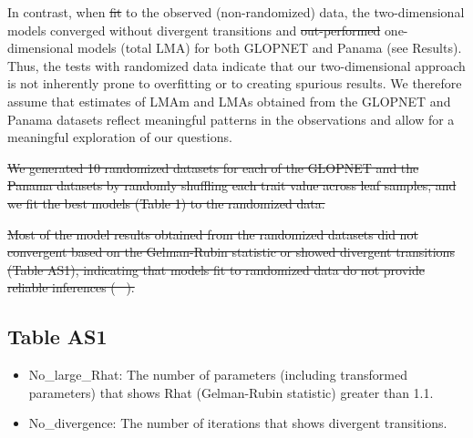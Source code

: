 \documentclass[
  12pt,
  letterpaper,
  DIV=11,
  numbers=noendperiod]{scrartcl}
\numberwithin{equation}{section} %
\providecommand{\DIFadd}[1]{{\protect\color{blue}\uwave{#1}}} %
\providecommand{\DIFdel}[1]{{\protect\color{red}\sout{#1}}}                      %
\providecommand{\DIFaddbegin}{} %
\providecommand{\DIFaddend}{} %
\providecommand{\DIFdelbegin}{} %
\providecommand{\DIFdelend}{} %
\newcommand{\DIFscaledelfig}{0.5}
\newlength{\DIFdelgraphicswidth} %
\newlength{\DIFdelgraphicsheight} %
\newcommand{\DIFaddincludegraphics}[2][]{{\color{blue}\fbox{\DIFOincludegraphics[#1]{#2}}}} %
\newcommand{\DIFdelincludegraphics}[2][]{%
\sbox{\DIFdelgraphicsbox}{\DIFOincludegraphics[#1]{#2}}%
\settoboxwidth{\DIFdelgraphicswidth}{\DIFdelgraphicsbox} %
\settoboxtotalheight{\DIFdelgraphicsheight}{\DIFdelgraphicsbox} %
\scalebox{\DIFscaledelfig}{%
\parbox[b]{\DIFdelgraphicswidth}{\usebox{\DIFdelgraphicsbox}\\[-\baselineskip] \rule{\DIFdelgraphicswidth}{0em}}\llap{\resizebox{\DIFdelgraphicswidth}{\DIFdelgraphicsheight}{%
\setlength{\unitlength}{\DIFdelgraphicswidth}%
\begin{picture}(1,1)%
\thicklines\linethickness{2pt} %
{\color[rgb]{1,0,0}\put(0,0){\framebox(1,1){}}}%
{\color[rgb]{1,0,0}\put(0,0){\line( 1,1){1}}}%
{\color[rgb]{1,0,0}\put(0,1){\line(1,-1){1}}}%
\end{picture}%
}\hspace*{3pt}}} %
} %
\DeclareRobustCommand{\DIFaddbegin}{\DIFOaddbegin \let\includegraphics\DIFaddincludegraphics} %
\DeclareRobustCommand{\DIFaddend}{\DIFOaddend \let\includegraphics\DIFOincludegraphics} %
\DeclareRobustCommand{\DIFdelbegin}{\DIFOdelbegin \let\includegraphics\DIFdelincludegraphics} %
\DeclareRobustCommand{\DIFdelend}{\DIFOaddend \let\includegraphics\DIFOincludegraphics} %
\begin{document}
\DIFaddend In contrast, when \DIFdelbegin \DIFdel{fit }\DIFdelend \DIFaddbegin \DIFadd{fitted }\DIFaddend to the observed (non-randomized) data, the
two-dimensional models converged without divergent transitions and
\DIFdelbegin \DIFdel{out-performed
}\DIFdelend \DIFaddbegin \DIFadd{outperformed }\DIFaddend one-dimensional models (total LMA) for both GLOPNET and
Panama (see Results). Thus, the tests with randomized data indicate that
our two-dimensional approach is not inherently prone to overfitting or
to creating spurious results. We therefore assume that estimates of LMAm
and LMAs obtained from the GLOPNET and Panama datasets reflect
meaningful patterns in the observations and allow for a meaningful
exploration of our questions.

\DIFdelbegin \DIFdel{We generated 10 randomized datasets for each of the GLOPNET and the
Panama datasets by randomly shuffling each trait value across leaf
samples, and we fit the best models (Table 1) to the randomized data.
}%

\DIFdel{Most of the model results obtained from the randomized datasets did not
convergent based on the Gelman-Rubin statistic or showed divergent
transitions (Table AS1), indicating that models fit to randomized data
do not provide reliable inferences
(\mbox{%
\citeproc{ref-Betancourt2016}{Betancourt, 2016}}\hspace{0pt}%
).
}%

\DIFdelend \subsection{Table AS1}\label{table-as1}

\begin{itemize}
\item
  No\_large\_Rhat: The number of parameters (including transformed
  parameters) that shows Rhat (Gelman-Rubin statistic) greater than 1.1.
\item
  No\_divergence: The number of iterations that shows divergent
  transitions.
\end{itemize}
\end{document}

